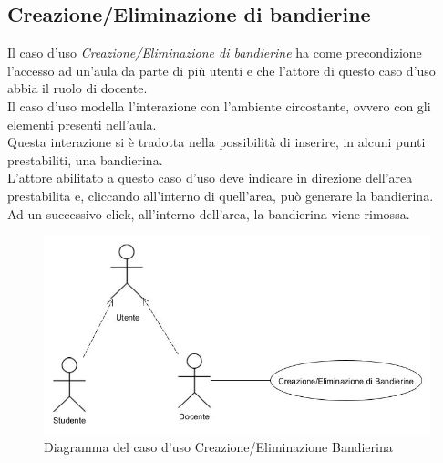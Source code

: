 \subsection{Creazione/Eliminazione di bandierine}
Il caso d'uso \textit{Creazione/Eliminazione di bandierine} ha come precondizione l'accesso ad un'aula da parte di più utenti e che l'attore di questo caso d'uso abbia il ruolo di docente.
\\Il caso d'uso modella l'interazione con l'ambiente circostante, ovvero con gli elementi presenti nell'aula. \\Questa interazione si è tradotta nella possibilità di inserire, in alcuni punti prestabiliti, una bandierina. \\L'attore abilitato a questo caso d'uso deve indicare in direzione dell'area prestabilita e, cliccando all'interno di quell'area, può generare la bandierina. \\Ad un successivo click, all'interno dell'area, la bandierina viene rimossa.
\begin{figure}[H]
    \centering
    \includegraphics[scale=0.6]{Immagini/EnvironmentInteractionUseCase.jpg}
    \caption{Diagramma del caso d'uso Creazione/Eliminazione Bandierina}
    \label{fig:my_label}
\end{figure}
